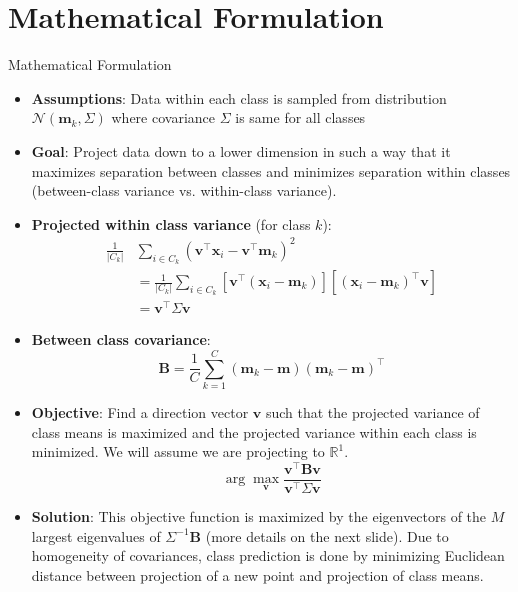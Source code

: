 \documentclass[9pt]{beamer}
\newcommand{\ve}[1]{\mathbf{#1}}
\begin{document}
\section{Mathematical Formulation} %
\begin{frame}{Mathematical Formulation}%
\begin{itemize}
    \item \textbf{Assumptions}: Data within each class is sampled from distribution $\mathcal{N}(\textbf{m}_k, \Sigma)$ where covariance $\Sigma$ is same for all classes
    \item \textbf{Goal}: Project data down to a lower dimension in such a way that it maximizes separation between classes and minimizes separation within classes (between-class variance vs. within-class variance).
    
    
    \item \textbf{Projected within class variance} (for class $k$):
    \begin{align*}
    \frac{1}{|C_k|} &\sum_{i \in C_k} (\ve{v}^\top \ve{x}_i - \ve{v}^\top \ve{m}_k)^2
    \\&= \frac{1}{|C_k|} \sum_{i \in C_k} [\ve{v}^\top (\ve{x}_i - \ve{m}_k)][(\ve{x}_i - \ve{m}_k)^\top \ve{v}]
    \\&= \ve{v}^\top \Sigma \ve{v}
    \end{align*}
    \end{itemize}
\end{frame}
\begin{frame}
\begin{itemize}
    \item \textbf{Between class covariance}:
    $$\ve{B}=\frac{1}{C}\sum_{k=1}^C (\ve{m}_k - \ve{m})(\ve{m}_k - \ve{m})^{\top}$$
    \item \textbf{Objective}: Find a direction vector $\ve{v}$ such that the projected variance of class means is maximized and the projected variance within each class is minimized.
    We will assume we are projecting to $\mathbb{R}^1$.
    $$\arg\!\max_{\ve{v}} \frac{\ve{v}^\top\ve{B}\ve{v}}{\ve{v}^\top\Sigma\ve{v}}$$
    \item \textbf{Solution}: This objective function is maximized by the eigenvectors of the $M$ largest eigenvalues of $\Sigma^{-1}\textbf{B}$ (more details on the next slide). Due to homogeneity of covariances, class prediction is done by minimizing Euclidean distance between projection of a new point and projection of class means.
\end{itemize}
\end{frame}
\end{document}
